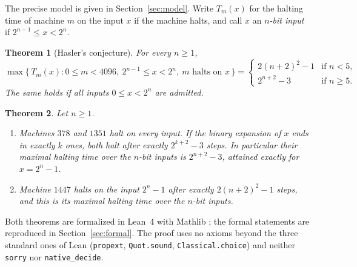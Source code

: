 \documentclass[11pt,a4paper]{amsart}
\newtheorem{theorem}{Theorem}
\theoremstyle{definition}
\theoremstyle{remark}
\newcommand{\lean}[1]{\texttt{#1}}
\begin{document}
The precise model is given in Section~\ref{sec:model}. Write $T_m(x)$ for the halting time of machine $m$ on
the input $x$ if the machine halts, and call $x$ an \emph{$n$-bit input} if $2^{n-1}\le x<2^n$.

\begin{theorem}[Hasler's conjecture]\label{thm:main}
For every $n\ge1$,
\[
\max\bigl\{\,T_m(x) : 0\le m<4096,\ 2^{n-1}\le x<2^n,\ m \text{ halts on } x \,\bigr\}
=\begin{cases} 2(n+2)^2-1 & \text{if } n<5,\\ 2^{n+2}-3 & \text{if } n\ge5.\end{cases}
\]
The same holds if all inputs $0\le x<2^n$ are admitted.
\end{theorem}

\begin{theorem}\label{thm:single}
Let $n\ge1$.
\begin{enumerate}[label=\textup{(\alph*)},leftmargin=2em]
\item Machines $378$ and $1351$ halt on every input. If the binary expansion of $x$ ends in exactly $k$ ones,
both halt after exactly $2^{k+2}-3$ steps. In particular their maximal halting time over the $n$-bit inputs
is $2^{n+2}-3$, attained exactly for $x=2^n-1$.
\item Machine $1447$ halts on the input $2^n-1$ after exactly $2(n+2)^2-1$ steps, and this is its maximal
halting time over the $n$-bit inputs.
\end{enumerate}
\end{theorem}

Both theorems are formalized in Lean~4 \cite{lean4} with Mathlib \cite{mathlib}; the formal statements are
reproduced in Section~\ref{sec:formal}. The proof uses no axioms beyond the three standard ones of Lean
(\lean{propext}, \lean{Quot.sound}, \lean{Classical.choice}) and neither \lean{sorry} nor
\lean{native\_decide}.
\end{document}
